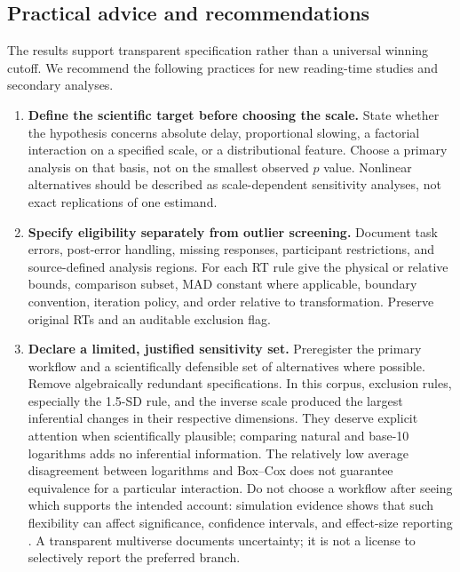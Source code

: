 \subsection{Practical advice and recommendations}

The results support transparent specification rather than a universal
winning cutoff. We recommend the following practices for new reading-time
studies and secondary analyses.

\begin{enumerate}
\item \textbf{Define the scientific target before choosing the scale.}
State whether the hypothesis concerns absolute delay, proportional slowing,
a factorial interaction on a specified scale, or a distributional feature.
Choose a primary analysis on that basis, not on the smallest observed
\(p\) value. Nonlinear alternatives should be described as
scale-dependent sensitivity analyses, not exact replications of one estimand.

\item \textbf{Specify eligibility separately from outlier screening.}
Document task errors, post-error handling, missing responses, participant
restrictions, and source-defined analysis regions. For each RT rule give
the physical or relative bounds, comparison subset, MAD constant where
applicable, boundary convention, iteration policy, and order relative
to transformation. Preserve original RTs and an auditable exclusion flag.

\item \textbf{Declare a limited, justified sensitivity set.}
Preregister the primary workflow and a scientifically defensible set of
alternatives where possible. Remove algebraically redundant specifications.
In this corpus, exclusion rules, especially the 1.5-SD rule, and the inverse
scale produced the largest inferential changes in their respective
dimensions. They deserve explicit attention when scientifically plausible;
comparing natural and base-10 logarithms adds no inferential information.
The relatively low average disagreement between logarithms and Box--Cox
does not guarantee equivalence for a particular interaction.
Do not choose a workflow after seeing which supports the intended account:
simulation evidence shows that such flexibility can affect significance,
confidence intervals, and effect-size reporting \citep{vankov_hazards_2023}.
A transparent multiverse documents uncertainty; it is not a license to
selectively report the preferred branch.


\end{enumerate}
